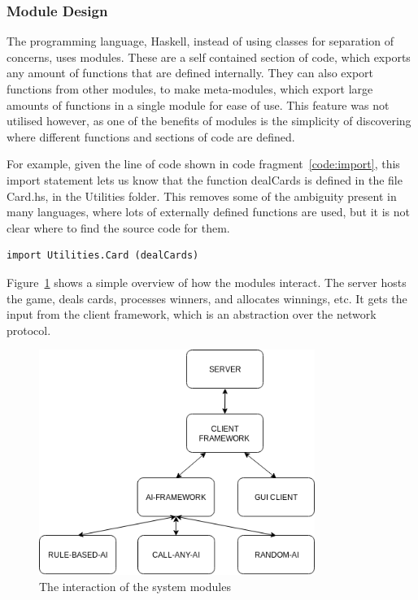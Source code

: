 \subsubsection{Module Design}

The programming language, Haskell, instead of using classes for separation
of concerns, uses modules. These are a self contained section of code, which
exports any amount of functions that are defined internally. They can also
export functions from other modules, to make meta-modules, which export
large amounts of functions in a single module for ease of use. This feature
was not utilised however, as one of the benefits of modules is the simplicity
of discovering where different functions and sections of code are defined.

For example, given the line of code shown in code fragment~\ref{code:import}, this
import statement lets us know that the function dealCards is defined in the
file Card.hs, in the Utilities folder. This removes some of the ambiguity
present in many languages, where lots of externally defined functions are
used, but it is not clear where to find the source code for them.

\vspace{0.3cm}

\begin{lstlisting}[label={code:import}, caption=An example import statement]
import Utilities.Card (dealCards)
\end{lstlisting}

Figure~\ref{fig:interoper} shows a simple overview of how the modules interact.
The server hosts the game, deals cards, processes winners, and allocates
winnings, etc. It gets the input from the client framework, which is an
abstraction over the network protocol.

\begin{figure}[H]
    \centering
    \includegraphics[width=0.8\textwidth]{../images/interoper.png}
    \caption{The interaction of the system modules}%
    \label{fig:interoper}
\end{figure}

